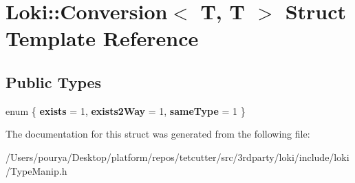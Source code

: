 \hypertarget{structLoki_1_1Conversion_3_01T_00_01T_01_4}{}\section{Loki\+:\+:Conversion$<$ T, T $>$ Struct Template Reference}
\label{structLoki_1_1Conversion_3_01T_00_01T_01_4}
\subsection*{Public Types}
\begin{DoxyCompactItemize}
\item 
\hypertarget{structLoki_1_1Conversion_3_01T_00_01T_01_4_a367bb176bfa136d00ec7ac1cf9c2c2f6}{}enum \{ {\bfseries exists} = 1, 
{\bfseries exists2\+Way} = 1, 
{\bfseries same\+Type} = 1
 \}\label{structLoki_1_1Conversion_3_01T_00_01T_01_4_a367bb176bfa136d00ec7ac1cf9c2c2f6}

\end{DoxyCompactItemize}


The documentation for this struct was generated from the following file\+:\begin{DoxyCompactItemize}
\item 
/\+Users/pourya/\+Desktop/platform/repos/tetcutter/src/3rdparty/loki/include/loki/Type\+Manip.\+h\end{DoxyCompactItemize}
